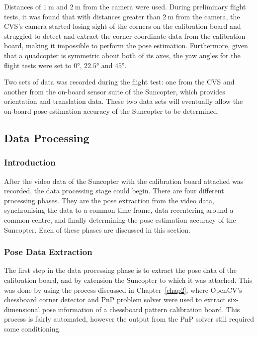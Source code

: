 Distances of $\SI{1}{\m}$ and $\SI{2}{\m}$ from the camera were used. During preliminary flight tests, it was found that with distances greater than $\SI{2}{\m}$ from the camera, the CVS's camera started losing sight of the corners on the calibration board and struggled to detect and extract the corner coordinate data from the calibration board, making it impossible to perform the pose estimation. Furthermore, given that a quadcopter is symmetric about both of its axes, the yaw angles for the flight tests were set to $\ang{0}$, $\ang{22.5}$ and $\ang{45}$. 

Two sets of data was recorded during the flight test: one from the CVS and another from the on-board sensor suite of the Suncopter, which provides orientation and translation data. These two data sets will eventually allow the on-board pose estimation accuracy of the Suncopter to be determined. 

\subsection{Data Processing}

\subsubsection{Introduction}

After the video data of the Suncopter with the calibration board attached was recorded, the data processing stage could begin. There are four different processing phases. They are the pose extraction from the video data, synchronising the data to a common time frame, data recentering around a common centre, and finally determining the pose estimation accuracy of the Suncopter. Each of these phases are discussed in this section. 

\subsubsection{Pose Data Extraction}

The first step in the data processing phase is to extract the pose data of the calibration board, and by extension the Suncopter to which it was attached. This was done by using the process discussed in Chapter~\ref{chap2}, where OpenCV's chessboard corner detector and PnP problem solver were used to extract six-dimensional pose information of a chessboard pattern calibration board. This process is fairly automated, however the output from the PnP solver still required some conditioning.

